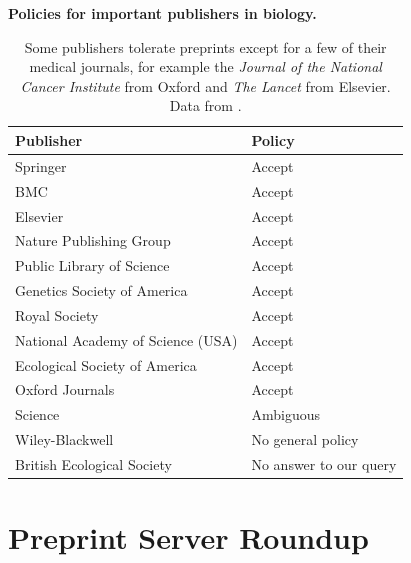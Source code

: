 \documentclass[letterpaper]{article}
\begin{document}
\begin{table}[!ht]
  \caption{\bf{Policies for important publishers in biology.}}
  \begin{tabular}{|ll|}
  \hline
  Publisher                             & Policy \\
  \hline
  Springer                              & Accept \\
  BMC                                   & Accept \\
  Elsevier                              & Accept \\
  Nature Publishing Group               & Accept \\
  Public Library of Science             & Accept \\
  Genetics Society of America           & Accept \\
  Royal Society                         & Accept \\
  National Academy of Science (USA)     & Accept \\
  Ecological Society of America         & Accept \\
  Oxford Journals                       & Accept \\
  Science                               & Ambiguous \\
  Wiley-Blackwell                       & No general policy \\
  British Ecological Society            & No answer to our query \\
  \hline
  \end{tabular}
  \caption{Some publishers tolerate preprints except for a few of their medical
journals, for example the \emph{ Journal of the National Cancer Institute}
from Oxford and \emph{The Lancet} from Elsevier. Data from \cite{war12}.}
  \label{table:policies}
\end{table}

\section{Preprint Server Roundup}
\end{document}
